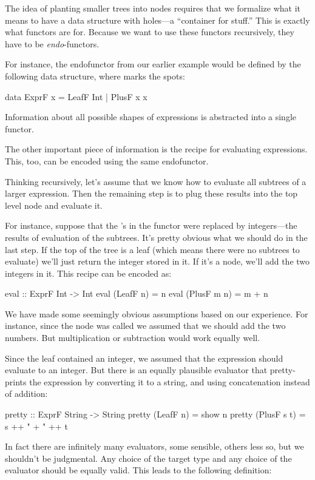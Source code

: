 \documentclass[DaoFP]{subfiles}
\begin{document}
The idea of planting smaller trees into nodes requires that we formalize what it means to have a data structure with holes---a ``container for stuff.'' This is exactly what functors are for. Because we want to use these functors recursively, they have to be \emph{endo}-functors.

For instance, the endofunctor from our earlier example would be defined by the following data structure, where  marks the spots:
\begin{haskell}
data ExprF x = LeafF Int | PlusF x x
\end{haskell}
Information about all possible shapes of expressions is abstracted into a single functor. 

The other important piece of information is the recipe for evaluating expressions. This, too, can be encoded using the same endofunctor. 

Thinking recursively, let's assume that we know how to evaluate all subtrees of a larger expression. Then the remaining step is to plug these results into the top level node and evaluate it. 

For instance, suppose that the 's in the functor were replaced by integers---the results of evaluation of the subtrees. It's pretty obvious what we should do in the last step. If the top of the tree is a leaf (which means there were no subtrees to evaluate) we'll just return the integer stored in it. If it's a  node, we'll add the two integers in it. This recipe can be encoded as:
\begin{haskell}
eval :: ExprF Int -> Int
eval (LeafF n)   = n
eval (PlusF m n) = m + n
\end{haskell}

We have made some seemingly obvious assumptions based on our experience. For instance, since the node was called  we assumed that we should add the two numbers. But multiplication or subtraction would work equally well.

Since the leaf contained an integer, we assumed that the expression should evaluate to an integer. But there is an equally plausible evaluator that pretty-prints the expression by converting it to a string, and using concatenation instead of addition:
\begin{haskell}
pretty :: ExprF String -> String
pretty (LeafF n)   = show n
pretty (PlusF s t) = s ++ " + " ++ t
\end{haskell}

In fact there are infinitely many evaluators, some sensible, others less so, but we shouldn't be judgmental. Any choice of the target type and any choice of the evaluator should be equally valid. This leads to the following definition:
\end{document}
